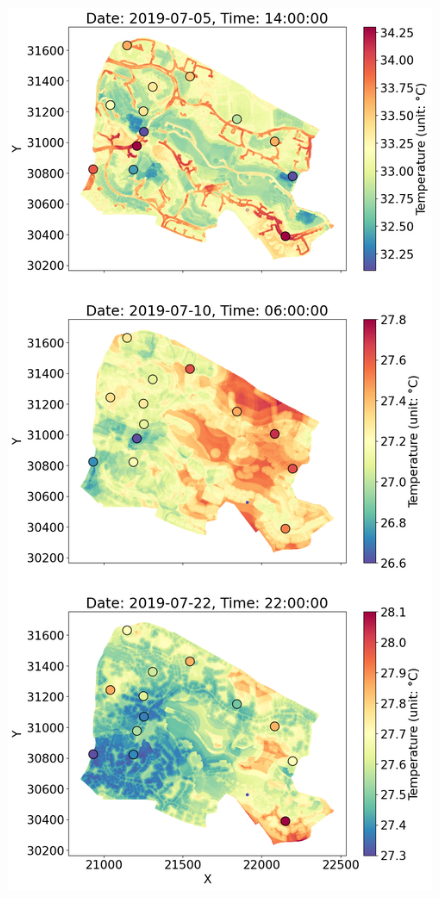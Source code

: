 \documentclass[a4paper,fleqn]{cas-sc}
\begin{document}
\begin{figure}[!h]
	\centering
	\includegraphics[scale=0.32]{figs/new_figs/tem_campusplot.png}

\end{figure}
\end{document}
